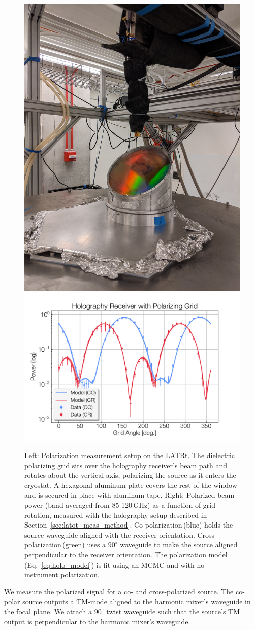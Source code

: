 \begin{figure}[t!]
    \centering
    \includegraphics[height = .4\textwidth]{Figures/polgrid.jpeg}
    \includegraphics[height = .46\textwidth]{Figures/holo_pol_data.pdf}
    \caption{Left: Polarization measurement setup on the LATRt.  The dielectric polarizing grid sits over the holography receiver's beam path and rotates about the vertical axis, polarizing the source as it enters the cryostat.  A hexagonal aluminum plate covers the rest of the window and is secured in place with aluminum tape.  Right: Polarized beam power (band-averaged from 85-120\,GHz) as a function of grid rotation, measured with the holography setup described in Section~\ref{sec:latot_meas_method}.  Co-polarization\,(blue) holds the source waveguide aligned with the receiver orientation.  Cross-polarization\,(green) uses a $90^{\circ}$ waveguide to make the source aligned perpendicular to the receiver orientation.  The polarization model (Eq.~\ref{eq:holo_model}) is fit using an MCMC and with no instrument polarization.}
    \label{fig:polgrid_setup}
\end{figure}

We measure the polarized signal for a co- and cross-polarized source.  The co-polar source outputs a TM-mode aligned to the harmonic mixer's waveguide in the focal plane.  We attach a $90^{\circ}$ twist waveguide such that the source's TM output is perpendicular to the harmonic mixer's waveguide.

